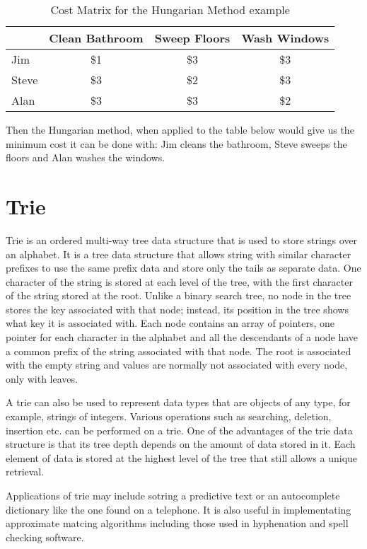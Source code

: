 \begin{table}[h!]
	\centering
	\begin{tabular}{ | l || c | c | c | }
		\hline
				& Clean Bathroom	& Sweep Floors	& Wash Windows	\\ \hline \hline
		Jim		& \$1				& \$3			& \$3				\\ \hline
		Steve	& \$3				& \$2			& \$3				\\ \hline
		Alan		& \$3				& \$3			& \$2				\\ \hline
	\end{tabular}
	\caption{Cost Matrix for the Hungarian Method example}
	\label{table:hungarian_example}
\end{table}
			
			Then the Hungarian method, when applied to the table below would give us the minimum cost it can be done with: Jim cleans the bathroom, Steve sweeps the floors and Alan washes the windows.
	
	\section{Trie}
	\label{sec:trie}
		Trie \cite{germann2009tightly} is an ordered multi-way tree data structure that is used to store strings over an alphabet. It is a tree data structure that allows string with similar character prefixes to use the same prefix data and store only the tails as separate data. One character of the string is stored at each level of the tree, with the first character of the string stored at the root. Unlike a binary search tree, no node in the tree stores the key associated with that node; instead, its position in the tree shows what key it is associated with. Each node contains an array of pointers, one pointer for each character in the alphabet and all the descendants of a node have a common prefix of the string associated with that node. The root is associated with the empty string and values are normally not associated with every node, only with leaves.
		
		A trie can also be used to represent data types that are objects of any type, for example, strings of integers. Various operations such as searching, deletion, insertion etc. can be performed on a trie. One of the advantages of the trie data structure is that its tree depth depends on the amount of data stored in it. Each element of data is stored at the highest level of the tree that still allows a unique retrieval.
		
		Applications of trie may include sotring a predictive text or an autocomplete dictionary like the one found on a telephone. It is also useful in implementating approximate matcing algorithms including those used in hyphenation and spell checking software.
		
